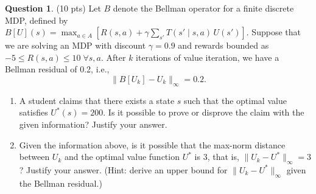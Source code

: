 \documentclass{article}
\theoremstyle{definition}
\newtheorem{question}[thm]{Question}
\begin{document}
\begin{question} (10 pts)
    Let $B$ denote the Bellman operator for a finite discrete MDP, defined by
        $B[U](s) = \max_{a\in A} [R(s, a) + \gamma \sum_{s'} T(s' \mid s,a) \, U(s')]$.
    Suppose that we are solving an MDP with discount $\gamma=0.9$ and rewards bounded as $-5 \le R(s,a) \le 10\; \forall s,a$. After $k$ iterations of value iteration, we have a Bellman residual of 0.2, i.e.,
    \[
        \|B[U_k] - U_k\|_\infty = 0.2.
    \]
    \begin{enumerate}[label=\alph*)]
        \item A student claims that there exists a state $s$ such that the optimal value satisfies $U^*(s)=200$. Is it possible to prove or disprove the claim with the given information? Justify your answer.
        \item Given the information above, is it possible that the max-norm distance between $U_k$ and the optimal value function $U^*$ is 3, that is, $\|U_k - U^*\|_\infty = 3$? Justify your answer. (Hint: derive an upper bound for $\|U_k - U^*\|_\infty$ given the Bellman residual.)
    \end{enumerate}
\end{question}
\end{document}

